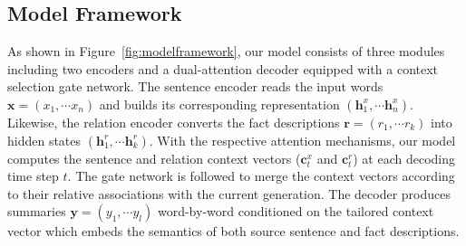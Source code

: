 \documentclass[letterpaper]{article} %
\begin{document}
	
	\subsection{Model Framework}
	As shown in Figure~\ref{fig:modelframework}, our model consists of three modules including two encoders and a dual-attention decoder equipped with a context selection gate network.
	The sentence encoder reads the input words
	${\mathbf{x}} = ({x_1}, \cdots {x_n})$ and builds its corresponding representation $({\mathbf{h}_1^x}, \cdots \mathbf{h}_n^x)$. 
	Likewise, the relation encoder converts the fact descriptions ${\mathbf{r}} = ({r_1}, \cdots {r_k})$ into hidden states $({\mathbf{h}_1^r}, \cdots \mathbf{h}_k^r)$.
	With the respective attention mechanisms, our model computes the sentence and relation context vectors ($\mathbf{c}_t^x$ and $\mathbf{c}_t^r$) at each decoding time step $t$.
	The gate network is followed to merge the context vectors according to their relative associations with the current generation.
	The decoder produces summaries ${\mathbf{y}} = ({y_1}, \cdots {y_l})$ word-by-word conditioned on the tailored context vector which embeds the semantics of both source sentence and fact descriptions.
	
\end{document}
